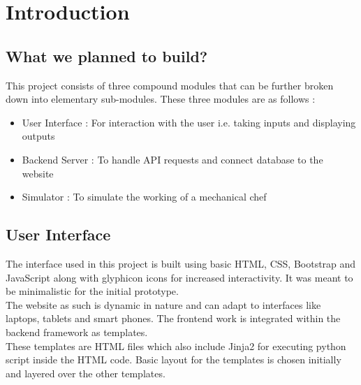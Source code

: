 \chapter{Introduction}
\section{What we planned to build?}
{\normalsize This project consists of three compound modules that can be further broken down into elementary sub-modules. These three modules are as {follows} :
\begin{itemize}
    \item User Interface : For interaction with the user i.e. taking inputs and displaying outputs
    \item Backend Server : To handle API requests and connect database to the website
    \item Simulator : To simulate the working of a mechanical chef
\end{itemize}
}
\section{User Interface}
{ \normalsize The interface used in this project is built using basic HTML, CSS, Bootstrap and JavaScript along with glyphicon icons for increased interactivity. It was meant to be minimalistic for the initial prototype. \\[0.1in]
The website as such is dynamic in nature and can adapt to interfaces like laptops, tablets and smart phones. The frontend work is integrated within the backend framework as templates. \\[0.1in]
These templates are HTML files which also include Jinja2 for executing python script inside the HTML code. Basic layout for the templates is chosen initially and layered over the other templates.
}
